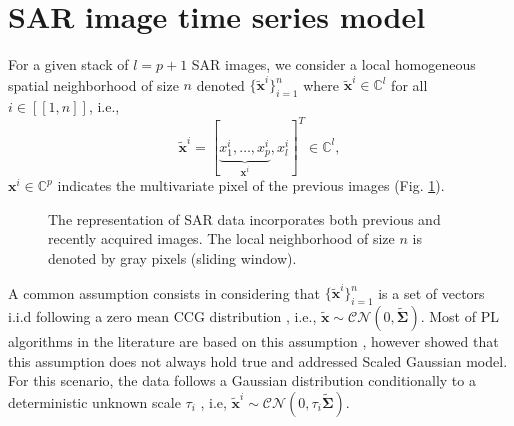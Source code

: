 \section{SAR image time series model}
    \label{section:data_model}
    \noindent
    For a given stack of $l = p+1$ \acs{SAR} images, we consider a local homogeneous spatial neighborhood of size $n$ denoted $\{\mathbf{\widetilde{x}}^i\}_{i=1}^n$ where $\mathbf{\widetilde{x}}^i \in \mathbb{C}^{l}$ for all $i \in [\! [1,n] \!]$, i.e., 
    \begin{equation}
        \label{eq:data}
            \mathbf{\widetilde{x}}^i = [\underbrace{x_1^i, \dots, x_p^i}_{\mathbf{x}^i}, x_{l}^i ]^T \in \mathbb{C}^{l},
    \end{equation}
    \noindent
    $\mathbf{x}^i \in \mathbb{C}^{p}$ indicates the multivariate pixel of the previous images (Fig. \ref{fig:datacube}). %
    \vspace{-0.5cm}
    \begin{figure}[hbt]
        \centering
        
        \caption{\small The representation of \acs{SAR} data incorporates both previous and recently acquired images. The local neighborhood of size $n$ is denoted by gray pixels (sliding window).}
        \label{fig:datacube}
    \end{figure}
    \vspace{-0.2cm}
    A common assumption consists in considering that $\{\mathbf{\widetilde{x}}^i\}_{i=1}^n$ is a set of vectors \ac{i.i.d} following a zero mean \acf{CCG} distribution \citep{bamler1998synthetic}, i.e., $\mathbf{\widetilde{x}}\sim\mathcal{CN}(0, \mathbf{\widetilde{\Sigma}})$. Most of \acs{PL} algorithms in the literature are based on this assumption \citep{ferretti2001permanent, ansari2018efficient, vu2022new, 9763551}, however \citep{mian2018new, vu2023robust} showed that this assumption does not always hold true
    and addressed Scaled Gaussian model. For this scenario, the data follows a Gaussian distribution conditionally to a deterministic unknown scale $\tau_i$ \citep{ollila2012complex, maronna2019robust}, i.e,  $\mathbf{\widetilde{x}}^i \sim\mathcal{CN}(0, \tau_i \mathbf{\widetilde{\Sigma}})$.
